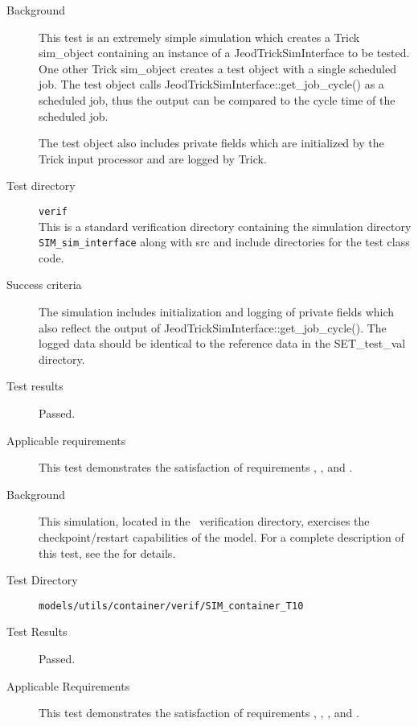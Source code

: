 \label{test:local_verif}
\begin{description}
\item[Background]
This test is an extremely simple simulation which
creates a Trick sim\_object containing 
an instance of a JeodTrickSimInterface to be tested.
One other Trick sim\_object creates a test object
with a single scheduled job.  The 
test object calls JeodTrickSimInterface::get\_job\_cycle() as
a scheduled job, thus the output can be compared
to the cycle time of the scheduled job.

The test object also includes private fields which are initialized by the 
Trick input processor and are logged by Trick.

\item[Test directory] {\tt verif} \\
This is a standard verification directory containing
the simulation directory  {\tt SIM\_sim\_interface}
along with src and include directories for the test class code.

\item[Success criteria]
The simulation includes initialization and logging of private fields 
which also reflect the output of 
JeodTrickSimInterface::get\_job\_cycle(). The logged data should be
identical to the 
reference data in the SET\_test\_val directory.

\item[Test results]
Passed.

\item[Applicable requirements]
This test demonstrates the satisfaction of
requirements ,
,
and .
\end{description}


\label{test:container_model_sim}
\begin{description}
\item[Background]
This simulation, located in the \CONTAINER\ verification directory,
exercises the checkpoint/restart capabilities of the model.
For a complete description of this test, see the
 for details.
\item[Test Directory]
\verb|models/utils/container/verif/SIM_container_T10|
\item[Test Results]
Passed.
\item[Applicable Requirements]
This test demonstrates the satisfaction of
requirements ,
,
,
and .
\end{description}


